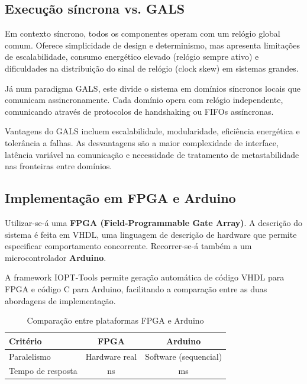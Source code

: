 \subsection{Execução síncrona vs. GALS}

Em contexto síncrono, todos os componentes operam com um relógio global comum. Oferece simplicidade de design e determinismo, mas apresenta limitações de escalabilidade, consumo energético elevado (relógio sempre ativo) e dificuldades na distribuição do sinal de relógio (clock skew) em sistemas grandes.

Já num paradigma GALS, este divide o sistema em domínios síncronos locais que comunicam assincronamente. Cada domínio opera com relógio independente, comunicando através de protocolos de handshaking ou FIFOs assíncronas.

Vantagens do GALS incluem escalabilidade, modularidade, eficiência energética e tolerância a falhas. As desvantagens são a maior complexidade de interface, latência variável na comunicação e necessidade de tratamento de metastabilidade nas fronteiras entre domínios.

\subsection{Implementação em FPGA e Arduino}

Utilizar-se-á uma \textbf{FPGA (Field-Programmable Gate Array)}. A descrição do sistema é feita em VHDL, uma linguagem de descrição de hardware que permite especificar comportamento concorrente. Recorrer-se-á também a um microcontrolador \textbf{Arduino}.

A framework IOPT-Tools permite geração automática de código VHDL para FPGA e código C para Arduino, facilitando a comparação entre as duas abordagens de implementação.

\begin{table}[H]
\centering
\small
\begin{tabular}{|l|c|c|}
\hline
\textbf{Critério} & \textbf{FPGA} & \textbf{Arduino} \\
\hline
Paralelismo & Hardware real & Software (sequencial) \\
Tempo de resposta & ns & ms \\
\hline
\end{tabular}
\caption{Comparação entre plataformas FPGA e Arduino}
\end{table}